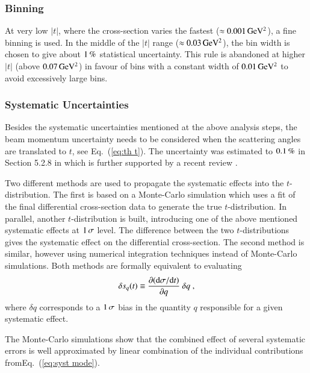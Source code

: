 
\subsubsection{Binning}
\label{sec:binning}

At very low $|t|$, where the cross-section varies the fastest ($\approx 0.001\,{\rm GeV^2}$), a fine binning is used. In the middle of the $|t|$ range ($\approx 0.03\,{\rm GeV^2}$), the bin width is chosen to give about $1\,{\rm \%}$ statistical uncertainty. This rule is abandoned at higher $|t|$ (above $0.07\,{\rm GeV^2}$) in favour of bins with a constant width of $0.01\,{\rm GeV^2}$ to avoid excessively large bins.



\subsubsection{Systematic Uncertainties}
\label{sec:systematics}

Besides the systematic uncertainties mentioned at the above analysis steps, the beam momentum uncertainty needs to be considered when the scattering angles are translated to $t$, see Eq.~(\ref{eq:th t}). The uncertainty was estimated to $0.1\,{\rm \%}$ in Section 5.2.8 in \cite{8tev-90m} which is further supported by a recent review \cite{todesco-lpc}.

Two different methods are used to propagate the systematic effects into the $t$-distribution. The first is based on a Monte-Carlo simulation which uses a fit of the final differential cross-section data to generate the true $t$-distribution. In parallel, another $t$-distribution is built, introducing one of the above mentioned systematic effects at $1\,{\rm \sigma}$ level. The difference between the two $t$-distributions gives the systematic effect on the differential cross-section. The second method is similar, however using numerical integration techniques instead of Monte-Carlo simulations. Both methods are formally equivalent to evaluating
\begin{equation}
\label{eq:syst mode}
\delta s_{q}(t) \equiv \frac{\partial({\rm d}\sigma/{\rm d} t)}{\partial q}\ \delta q\ ,
\end{equation}
where $\delta q$ corresponds to a $1\,{\rm \sigma}$ bias in the quantity $q$ responsible for a given systematic effect.

The Monte-Carlo simulations show that the combined effect of several systematic errors is well approximated by linear combination of the individual contributions from\Break Eq.~(\ref{eq:syst mode}).


